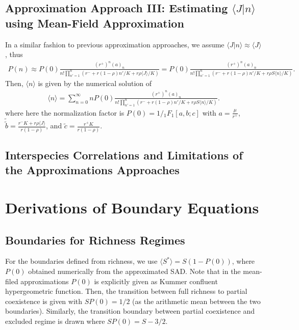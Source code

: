 \documentclass[9pt,twoside,lineno]{pnas-new}
\begin{document}
\subsection*{Approximation Approach III: Estimating $\langle J|n\rangle $ using Mean-Field Approximation } In a similar fashion to previous approximation approaches, we assume $\langle J|n\rangle \approx \langle J\rangle  $, thus
\begin{eqnarray}
    P(n) \approx P(0)\frac{(r^+)^{n}(a)_{n}}{n!\prod_{n'=1}^{n}\left(r^-+r (1-\rho)n'/K + r\rho \langle J \rangle /K \right)}=  P(0)\frac{(r^+)^{n}(a)_{n}}{n!\prod_{n'=1}^{n}\left(r^-+r (1-\rho)n'/K + r\rho S\langle n\rangle  /K \right)}.
\end{eqnarray}
Then, $\langle n \rangle$ is given by the numerical solution of
\begin{eqnarray}
    \langle n \rangle = \sum_{n=0}^{\infty} n P(0)\frac{(r^+)^{n}(a)_{n}}{n!\prod_{n'=1}^{n}\left(r^-+r (1-\rho)n'/K + r\rho S\langle n\rangle  /K \right)}.
\end{eqnarray}
where here the normalization factor is $P(0)=1/{_1}F_1[a,b;c]$ with $a=\frac{\mu}{r^+}$, $\tilde{\tilde{b}}= \frac{r^-K+r\rho \langle J\rangle }{r(1-\rho)}$, and $\tilde{c}=\frac{r^+ K}{r(1-\rho)}$.

\subsection*{Interspecies Correlations and Limitations of the Approximations Approaches}

\section*{Derivations of Boundary Equations}

\subsection*{Boundaries for Richness Regimes} For the boundaries defined from richness, we use
$    \langle S^* \rangle = S \left(1-P(0)\right) 
$, where $P(0)$ obtained numerically from the approximated SAD. Note that in the mean-filed approximations $P(0)$ is explicitly given as Kummer confluent hypergeometric function. Then, the transition between full richness to partial coexistence is given with $S P(0) = 1/2$ (as the arithmetic mean between the two boundaries). Similarly, the transition boundary between partial coexistence and excluded regime is drawn where   $SP(0)=S-3/2$.  
\end{document}

